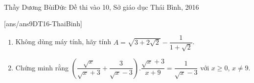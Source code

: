 \begin{name}
{Thầy Dương BùiĐức}
{Đề thi vào 10, Sở giáo dục Thái Bình, 2016}
\end{name}
\setcounter{ex}{0}
[ans/ans9DT16-ThaiBinh]
\begin{ex}%
    \hfill
    \begin{enumerate}
        \item Không dùng máy tính, hãy tính $A=\sqrt{3+2\sqrt{2}}-\dfrac{1}{1+\sqrt{2}}$.
        \item Chứng minh rằng $\left(\dfrac{\sqrt{x}}{\sqrt{x}+3}+\dfrac{3}{\sqrt{x}-3}\right).\dfrac{\sqrt{x}+3}{x+9}=\dfrac{1}{\sqrt{x}-3}$ với $x\geq 0$, $x\neq 9$.
    \end{enumerate}
\end{ex}

